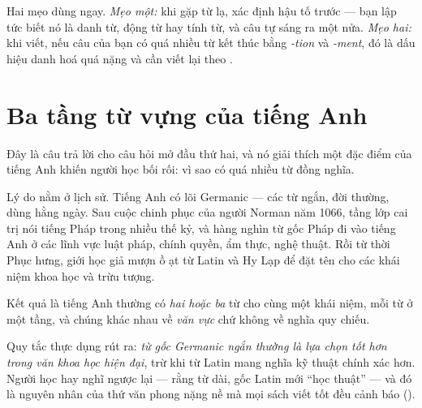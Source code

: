 \documentclass[../../english.tex]{subfiles}
\begin{document}
Hai mẹo dùng ngay. \emph{Mẹo một:} khi gặp từ lạ, xác định hậu tố trước --- bạn lập tức biết nó là danh từ, động từ hay tính từ, và câu tự sáng ra một nửa. \emph{Mẹo hai:} khi viết, nếu câu của bạn có quá nhiều từ kết thúc bằng \emph{-tion} và \emph{-ment}, đó là dấu hiệu danh hoá quá nặng và cần viết lại theo .

\section{Ba tầng từ vựng của tiếng Anh}

Đây là câu trả lời cho câu hỏi mở đầu thứ hai, và nó giải thích một đặc điểm của tiếng Anh khiến người học bối rối: vì sao có quá nhiều từ đồng nghĩa.

Lý do nằm ở lịch sử. Tiếng Anh có lõi Germanic --- các từ ngắn, đời thường, dùng hằng ngày. Sau cuộc chinh phục của người Norman năm 1066, tầng lớp cai trị nói tiếng Pháp trong nhiều thế kỷ, và hàng nghìn từ gốc Pháp đi vào tiếng Anh ở các lĩnh vực luật pháp, chính quyền, ẩm thực, nghệ thuật. Rồi từ thời Phục hưng, giới học giả mượn ồ ạt từ Latin và Hy Lạp để đặt tên cho các khái niệm khoa học và trừu tượng.

Kết quả là tiếng Anh thường có \emph{hai hoặc ba} từ cho cùng một khái niệm, mỗi từ ở một tầng, và chúng khác nhau về \emph{văn vực} chứ không về nghĩa quy chiếu.

\begin{tuvung}
\end{tuvung}

Quy tắc thực dụng rút ra: \emph{từ gốc Germanic ngắn thường là lựa chọn tốt hơn trong văn khoa học hiện đại}, trừ khi từ Latin mang nghĩa kỹ thuật chính xác hơn. Người học hay nghĩ ngược lại --- rằng từ dài, gốc Latin mới ``học thuật'' --- và đó là nguyên nhân của thứ văn phong nặng nề mà mọi sách viết tốt đều cảnh báo ().
\end{document}
